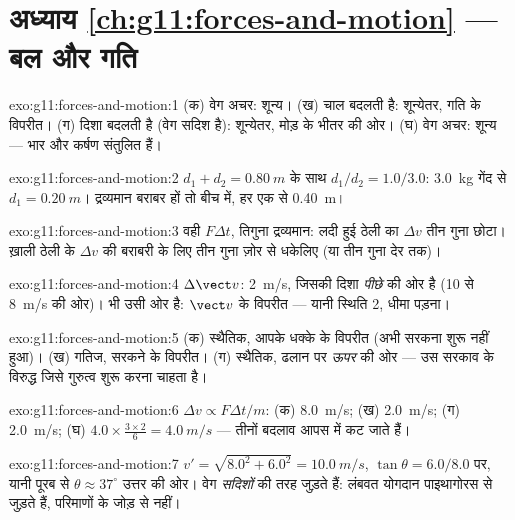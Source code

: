 \section*{अध्याय \ref{ch:g11:forces-and-motion} --- बल और गति}

\begin{solution}{exo:g11:forces-and-motion:1}
(क) वेग अचर:  शून्य। (ख) चाल बदलती है: शून्येतर, गति के
विपरीत। (ग) दिशा बदलती है (वेग सदिश है): शून्येतर, मोड़ के भीतर की ओर।
(घ) वेग अचर: शून्य --- भार और कर्षण संतुलित हैं।
\end{solution}

\begin{solution}{exo:g11:forces-and-motion:2}
$d_1 + d_2 = \qty{0.80}{m}$ के साथ $d_1/d_2 = 1.0/3.0$: \qty{3.0}{kg} गेंद से $d_1 = \qty{0.20}{m}$। द्रव्यमान बराबर हों तो बीच में, हर
एक से \qty{0.40}{m}।
\end{solution}

\begin{solution}{exo:g11:forces-and-motion:3}
वही $F\Delta t$, तिगुना द्रव्यमान: लदी हुई ठेली का $\Delta v$ तीन गुना छोटा। ख़ाली
ठेली के $\Delta v$ की बराबरी के लिए तीन गुना ज़ोर से धकेलिए (या तीन गुना देर
तक)।
\end{solution}

\begin{solution}{exo:g11:forces-and-motion:4}
$\Delta \vect v$: \qty{2}{m/s}, जिसकी दिशा \emph{पीछे} की ओर है (\num{10} से \qty{8}{m/s} की ओर)।
 भी उसी ओर है: $\vect v$ के विपरीत --- यानी स्थिति 2, धीमा
पड़ना।
\end{solution}

\begin{solution}{exo:g11:forces-and-motion:5}
(क) स्थैतिक, आपके धक्के के विपरीत (अभी सरकना शुरू नहीं हुआ)। (ख) गतिज,
सरकने के विपरीत। (ग) स्थैतिक, ढलान पर \emph{ऊपर} की ओर --- उस सरकाव के
विरुद्ध जिसे गुरुत्व शुरू करना चाहता है।
\end{solution}

\begin{solution}{exo:g11:forces-and-motion:6}
$\Delta v \propto F\Delta t/m$: (क) \qty{8.0}{m/s}; (ख) \qty{2.0}{m/s}; (ग) \qty{2.0}{m/s}; (घ) $4.0 \times \frac{3 \times 2}{6} =
\qty{4.0}{m/s}$ --- तीनों बदलाव आपस
में कट जाते हैं।
\end{solution}

\begin{solution}{exo:g11:forces-and-motion:7}
$v' = \sqrt{8.0^2 + 6.0^2} = \qty{10.0}{m/s}$, $\tan\theta =
6.0/8.0$ पर, यानी पूरब से $\theta \approx 37^\circ$ उत्तर की ओर। वेग \emph{सदिशों} की तरह
जुड़ते हैं: लंबवत योगदान पाइथागोरस से जुड़ते हैं, परिमाणों के जोड़ से नहीं।
\end{solution}

